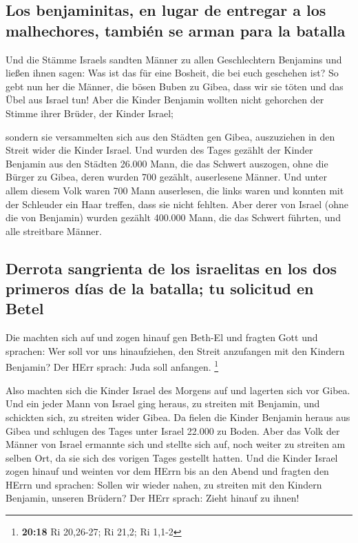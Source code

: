 \hypertarget{los-benjaminitas-en-lugar-de-entregar-a-los-malhechores-tambiuxe9n-se-arman-para-la-batalla}{%
\subsection{Los benjaminitas, en lugar de entregar a los malhechores,
también se arman para la
batalla}\label{los-benjaminitas-en-lugar-de-entregar-a-los-malhechores-tambiuxe9n-se-arman-para-la-batalla}}

 Und die Stämme Israels sandten Männer zu allen
Geschlechtern Benjamins und ließen ihnen sagen: Was ist das für eine
Bosheit, die bei euch geschehen ist?  So gebt nun her die
Männer, die bösen Buben zu Gibea, dass wir sie töten und das Übel aus
Israel tun! Aber die Kinder Benjamin wollten nicht gehorchen der Stimme
ihrer Brüder, der Kinder Israel;

 sondern sie versammelten sich aus den Städten gen Gibea,
auszuziehen in den Streit wider die Kinder Israel.  Und
wurden des Tages gezählt der Kinder Benjamin aus den Städten 26.000
Mann, die das Schwert auszogen, ohne die Bürger zu Gibea, deren wurden
700 gezählt, auserlesene Männer.  Und unter allem diesem
Volk waren 700 Mann auserlesen, die links waren und konnten mit der
Schleuder ein Haar treffen, dass sie nicht fehlten.  Aber
derer von Israel (ohne die von Benjamin) wurden gezählt 400.000 Mann,
die das Schwert führten, und alle streitbare Männer.

\hypertarget{derrota-sangrienta-de-los-israelitas-en-los-dos-primeros-duxedas-de-la-batalla-tu-solicitud-en-betel}{%
\subsection{Derrota sangrienta de los israelitas en los dos primeros
días de la batalla; tu solicitud en
Betel}\label{derrota-sangrienta-de-los-israelitas-en-los-dos-primeros-duxedas-de-la-batalla-tu-solicitud-en-betel}}

 Die machten sich auf und zogen hinauf gen Beth-El und
fragten Gott und sprachen: Wer soll vor uns hinaufziehen, den Streit
anzufangen mit den Kindern Benjamin? Der HErr sprach: Juda soll
anfangen. \footnote{\textbf{20:18} Ri 20,26-27; Ri 21,2; Ri 1,1-2}

 Also machten sich die Kinder Israel des Morgens auf und
lagerten sich vor Gibea.  Und ein jeder Mann von Israel
ging heraus, zu streiten mit Benjamin, und schickten sich, zu streiten
wider Gibea.  Da fielen die Kinder Benjamin heraus aus
Gibea und schlugen des Tages unter Israel 22.000 zu Boden.
 Aber das Volk der Männer von Israel ermannte sich und
stellte sich auf, noch weiter zu streiten am selben Ort, da sie sich des
vorigen Tages gestellt hatten.  Und die Kinder Israel
zogen hinauf und weinten vor dem HErrn bis an den Abend und fragten den
HErrn und sprachen: Sollen wir wieder nahen, zu streiten mit den Kindern
Benjamin, unseren Brüdern? Der HErr sprach: Zieht hinauf zu ihnen!

